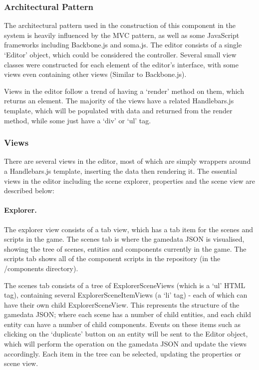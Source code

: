 	\subsubsection{Architectural Pattern}
	The architectural pattern used in the construction of this component in the system is heavily influenced by the MVC pattern, as well as some JavaScript frameworks including Backbone.js and soma.js. The editor consists of a single `Editor' object, which could be considered the controller. Several small view classes were constructed for each element of the editor's interface, with some views even containing other views (Similar to Backbone.js).

	Views in the editor follow a trend of having a `render' method on them, which returns an element. The majority of the views have a related Handlebars.js template, which will be populated with data and returned from the render method, while some just have a `div' or `ul' tag.

	\subsubsection{Views}
	There are several views in the editor, most of which are simply wrappers around a Handlebars.js template, inserting the data then rendering it. The essential views in the editor including the scene explorer, properties and the scene view are described below:

	\paragraph{Explorer.}
	The explorer view consists of a tab view, which has a tab item for the scenes and scripts in the game. The scenes tab is where the gamedata JSON is visualised, showing the tree of scenes, entities and components currently in the game. The scripts tab shows all of the component scripts in the repository (in the /components directory).

	The scenes tab consists of a tree of ExplorerSceneViews (which is a `ul' HTML tag), containing several ExplorerSceneItemViews (a `li' tag) - each of which can have their own child ExplorerSceneView. This represents the structure of the gamedata JSON; where each scene has a number of child entities, and each child entity can have a number of child components. Events on these items such as clicking on the `duplicate' button on an entity will be sent to the Editor object, which will perform the operation on the gamedata JSON and update the views accordingly. Each item in the tree can be selected, updating the properties or scene view.

